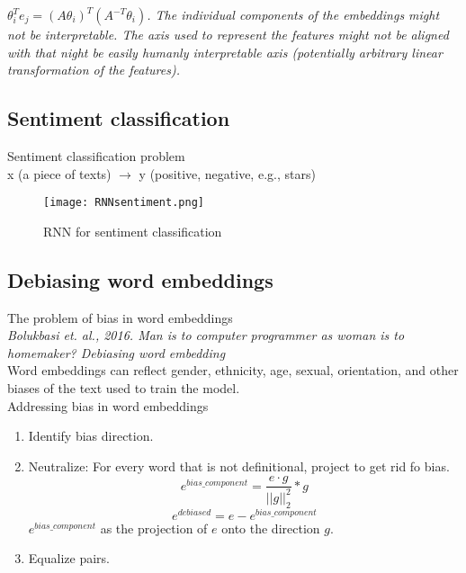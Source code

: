 \emph{\textcolor{Bittersweet}{$\displaystyle \theta_i^T e_j = (A\theta_i)^T(A^{-T}\theta_i)$. The individual components of the embeddings might not be interpretable. The axis used to represent the features might not be aligned with that night be easily humanly interpretable axis (potentially arbitrary linear transformation of the features).}}

%
\subsection{Sentiment classification}
Sentiment classification problem\\
x (a piece of texts) $\longrightarrow$ y (positive, negative, e.g., stars)
\begin{figure}[h]
\centering
\texttt{[image: RNNsentiment.png]}
\caption{RNN for sentiment classification}
\label{fig:RNNsentiment}
\end{figure}

%
\subsection{Debiasing word embeddings}
The problem of bias in word embeddings\\
\textit{Bolukbasi et. al., 2016. Man is to computer programmer as woman is to homemaker? Debiasing word embedding}\\
Word embeddings can reflect gender, ethnicity, age, sexual, orientation, and other biases of the text used to train the model.\\
Addressing bias in word embeddings
\begin{enumerate}
\item
Identify bias direction.
\item
Neutralize: For every word that is not definitional, project to get rid fo bias.\\
$$e^{bias\_component} = \frac{e \cdot g}{||g||_2^2} * g$$
$$e^{debiased} = e - e^{bias\_component}$$
$e^{bias\_component}$ as the projection of $e$ onto the direction $g$.
\item
Equalize pairs.
\end{enumerate}


